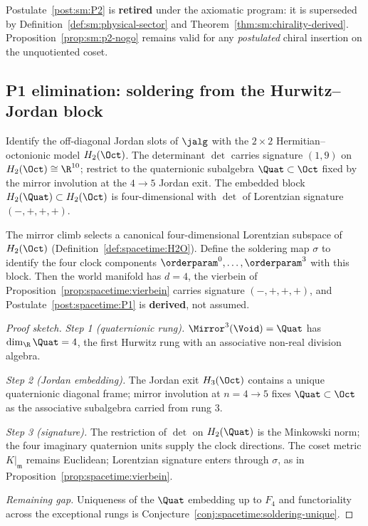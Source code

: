 \begin{remark}
Postulate~\ref{post:sm:P2} is \textbf{retired} under the axiomatic program:
it is superseded by Definition~\ref{def:sm:physical-sector} and
Theorem~\ref{thm:sm:chirality-derived}. Proposition~\ref{prop:sm:p2-nogo}
remains valid for any \emph{postulated} chiral insertion on the unquotiented
coset.
\end{remark}

\subsection{P1 elimination: soldering from the Hurwitz--Jordan block}
\label{sec:axiomatic:p1}

\begin{definition}
\label{def:spacetime:H2O}
Identify the off-diagonal Jordan slots of $\jalg$ with the $2\times2$
Hermitian--octonionic model $H_2(\Oct)$. The determinant $\det$ carries
signature $(1,9)$ on $H_2(\Oct)\cong\R^{10}$; restrict to the quaternionic
subalgebra $\Quat\subset\Oct$ fixed by the mirror involution at the
$4\to5$ Jordan exit. The embedded block $H_2(\Quat)\subset H_2(\Oct)$ is
four-dimensional with $\det$ of Lorentzian signature $(-,+,+,+)$.
\end{definition}

\begin{theorem}
\label{thm:spacetime:soldering-derived}
The mirror climb selects a canonical four-dimensional Lorentzian subspace of
$H_2(\Oct)$ (Definition~\ref{def:spacetime:H2O}). Define the soldering map
$\sigma$ to identify the four clock components $\orderparam^0,\ldots,\orderparam^3$
with this block. Then the world manifold has $d=4$, the vierbein of
Proposition~\ref{prop:spacetime:vierbein} carries signature
$(-,+,+,+)$, and Postulate~\ref{post:spacetime:P1} is \textbf{derived},
not assumed.
\end{theorem}

\begin{proof}[Proof sketch]
\emph{Step 1 (quaternionic rung).} $\Mirror^3(\Void)=\Quat$ has
$\dim_{\R}\Quat=4$, the first Hurwitz rung with an associative non-real
division algebra.

\emph{Step 2 (Jordan embedding).} The Jordan exit $H_3(\Oct)$ contains a
unique quaternionic diagonal frame; mirror involution at $n=4\to5$ fixes
$\Quat\subset\Oct$ as the associative subalgebra carried from rung $3$.

\emph{Step 3 (signature).} The restriction of $\det$ on $H_2(\Quat)$ is the
Minkowski norm; the four imaginary quaternion units supply the clock directions.
The coset metric $K|_{\mathfrak{m}}$ remains Euclidean; Lorentzian signature
enters through $\sigma$, as in Proposition~\ref{prop:spacetime:vierbein}.

\emph{Remaining gap.} Uniqueness of the $\Quat$ embedding up to $F_4$ and
functoriality across the exceptional rungs is Conjecture~\ref{conj:spacetime:soldering-unique}.
\end{proof}

